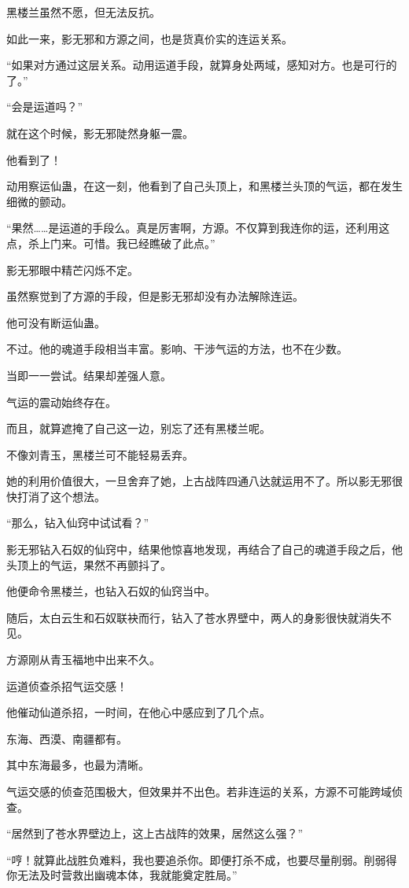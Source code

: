 \begin{this_body}
黑楼兰虽然不愿，但无法反抗。

如此一来，影无邪和方源之间，也是货真价实的连运关系。

“如果对方通过这层关系。动用运道手段，就算身处两域，感知对方。也是可行的了。”

“会是运道吗？”

就在这个时候，影无邪陡然身躯一震。

他看到了！

动用察运仙蛊，在这一刻，他看到了自己头顶上，和黑楼兰头顶的气运，都在发生细微的颤动。

“果然……是运道的手段么。真是厉害啊，方源。不仅算到我连你的运，还利用这点，杀上门来。可惜。我已经瞧破了此点。”

影无邪眼中精芒闪烁不定。

虽然察觉到了方源的手段，但是影无邪却没有办法解除连运。

他可没有断运仙蛊。

不过。他的魂道手段相当丰富。影响、干涉气运的方法，也不在少数。

当即一一尝试。结果却差强人意。

气运的震动始终存在。

而且，就算遮掩了自己这一边，别忘了还有黑楼兰呢。

不像刘青玉，黑楼兰可不能轻易丢弃。

她的利用价值很大，一旦舍弃了她，上古战阵四通八达就运用不了。所以影无邪很快打消了这个想法。

“那么，钻入仙窍中试试看？”

影无邪钻入石奴的仙窍中，结果他惊喜地发现，再结合了自己的魂道手段之后，他头顶上的气运，果然不再颤抖了。

他便命令黑楼兰，也钻入石奴的仙窍当中。

随后，太白云生和石奴联袂而行，钻入了苍水界壁中，两人的身影很快就消失不见。

方源刚从青玉福地中出来不久。

运道侦查杀招气运交感！

他催动仙道杀招，一时间，在他心中感应到了几个点。

东海、西漠、南疆都有。

其中东海最多，也最为清晰。

气运交感的侦查范围极大，但效果并不出色。若非连运的关系，方源不可能跨域侦查。

“居然到了苍水界壁边上，这上古战阵的效果，居然这么强？”

“哼！就算此战胜负难料，我也要追杀你。即便打杀不成，也要尽量削弱。削弱得你无法及时营救出幽魂本体，我就能奠定胜局。”


\end{this_body}
